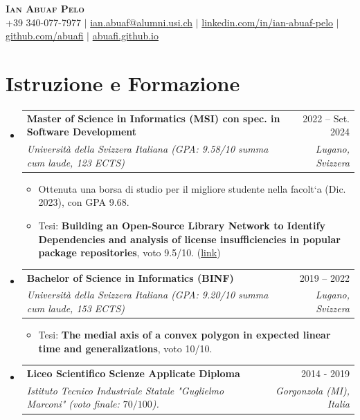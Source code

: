 \documentclass[letterpaper,11pt]{article}
\makeatletter
\newcommand{\resumeItem}[1]{
  \item\small{
    {#1 \vspace{-2pt}}
  }
}
\newcommand{\resumeSubheading}[4]{
  \vspace{-2pt}\item
    \begin{tabular*}{0.97\textwidth}[t]{l@{\extracolsep{\fill}}r}
      \textbf{#1} & #2 \\
      \textit{\small#3} & \textit{\small #4} \\
    \end{tabular*}\vspace{-7pt}
}
\newcommand{\resumeSubHeadingListStart}{\begin{itemize}[leftmargin=0.15in, label={}]}
\newcommand{\resumeSubHeadingListEnd}{\end{itemize}}
\newcommand{\resumeItemListStart}{\begin{itemize}}
\newcommand{\resumeItemListEnd}{\end{itemize}\vspace{-5pt}}
\makeatother
\begin{document}

\begin{center}
    \textbf{\Huge \scshape Ian Abuaf Pelo} \\ \vspace{1pt}
    \small +39 340-077-7977 $|$ \href{mailto:ian.abuaf@alumni.usi.ch}{ian.abuaf@alumni.usi.ch} $|$ 
    \href{https://www.linkedin.com/in/ian-abuaf-pelo}{linkedin.com/in/ian-abuaf-pelo} $|$
    \href{https://github.com/abuafi}{github.com/abuafi} $|$
    \href{https://abuafi.github.io}{abuafi.github.io}
\end{center}


\section{Istruzione e Formazione}
\resumeSubHeadingListStart
  \resumeSubheading
  {Master of Science in Informatics (MSI) con spec. in Software Development}
  {2022 -- Set. 2024}
  {Università della Svizzera Italiana (GPA: 9.58/10 summa cum laude, 123 ECTS)}
  {Lugano, Svizzera}
  \resumeItemListStart
    \resumeItem{Ottenuta una borsa di studio per il migliore studente nella facolt`a (Dic. 2023), con GPA 9.68.}
    \resumeItem{Tesi: \textbf{Building an Open-Source Library Network to Identify Dependencies and analysis of
    license insufficiencies in popular package repositories}, voto 9.5/10. (\href{https://thesis.bul.sbu.usi.ch/theses/2331-2324AbuafPelo/pdf}{link})}
  \resumeItemListEnd
  \resumeSubheading
  {Bachelor of Science in Informatics (BINF) }
  {2019 -- 2022}
  {Università della Svizzera Italiana (GPA: 9.20/10 summa cum laude, 153 ECTS)}
  {Lugano, Svizzera}
  \resumeItemListStart
  \resumeItem{Tesi: \textbf{The medial axis of a convex polygon in expected linear time and generalizations}, voto 10/10.}
  \resumeItemListEnd
\vspace{-1px}
\resumeSubheading
  {Liceo Scientifico Scienze Applicate Diploma}
  {2014 - 2019}
  {Istituto Tecnico Industriale Statale "Guglielmo Marconi" (voto finale: $70/100$).}
  {Gorgonzola (MI), Italia}
\resumeSubHeadingListEnd
\end{document}
